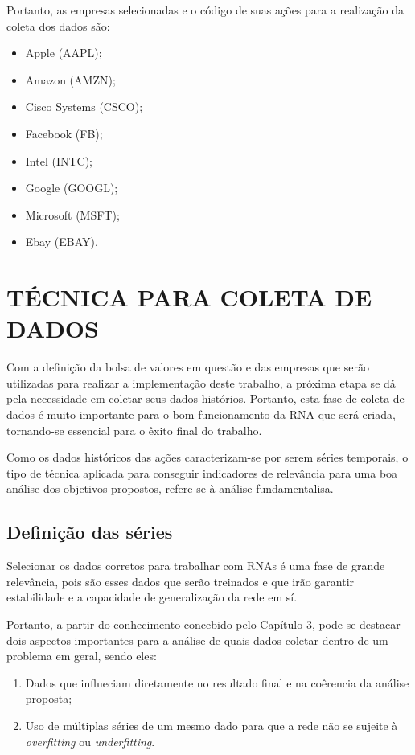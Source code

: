 Portanto, as empresas selecionadas e o código de suas ações para a realização da coleta dos dados são:
\begin{itemize}
	\item Apple (AAPL);
	\item Amazon (AMZN);
	\item Cisco Systems (CSCO);
	\item Facebook (FB);
	\item Intel (INTC);
	\item Google (GOOGL);
	\item Microsoft (MSFT);
	\item Ebay (EBAY).
\end{itemize}

\section{TÉCNICA PARA COLETA DE DADOS}
Com a definição da bolsa de valores em questão e das empresas que serão utilizadas para realizar a implementação deste trabalho, a próxima etapa se dá pela necessidade em coletar seus dados histórios. Portanto, esta fase de coleta de dados é muito importante para o bom funcionamento da RNA que será criada, tornando-se essencial para o êxito final do trabalho.

Como os dados históricos das ações caracterizam-se por serem séries temporais, o tipo de técnica aplicada para conseguir indicadores de relevância para uma boa análise dos objetivos propostos, refere-se à análise fundamentalisa. 

\subsection{Definição das séries}
Selecionar os dados corretos para trabalhar com RNAs é uma fase de grande relevância, pois são esses dados que serão treinados e que irão garantir estabilidade e a capacidade de generalização da rede em sí.

Portanto, a partir do conhecimento concebido pelo Capítulo 3, pode-se destacar dois aspectos importantes para a análise de quais dados coletar dentro de um problema em geral, sendo eles:

\begin{enumerate}
\item Dados que influeciam diretamente no resultado final e na coêrencia da análise proposta;
\item Uso de múltiplas séries de um mesmo dado para que a rede não se sujeite à \textit{overfitting} ou \textit{underfitting}.
\end{enumerate}

